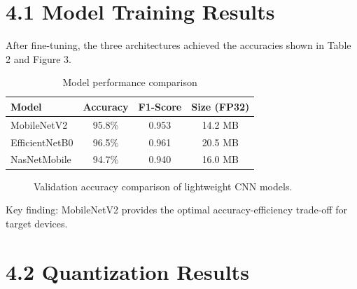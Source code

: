 \documentclass[12pt,letterpaper]{report}
\begin{document}
\section*{4.1 Model Training Results}

After fine-tuning, the three architectures achieved the accuracies shown in Table 2 and Figure 3.

\begin{table}[H]
\centering
\caption{Model performance comparison}
\label{tab:model_perf}
\begin{tabular}{@{}lccc@{}}
\toprule
\textbf{Model} & \textbf{Accuracy} & \textbf{F1-Score} & \textbf{Size (FP32)} \\
\midrule
MobileNetV2 & 95.8\% & 0.953 & 14.2 MB \\
EfficientNetB0 & 96.5\% & 0.961 & 20.5 MB \\
NasNetMobile & 94.7\% & 0.940 & 16.0 MB \\
\bottomrule
\end{tabular}
\end{table}

\begin{figure}[H]
\centering
{}
\caption{Validation accuracy comparison of lightweight CNN models.}
\label{fig:accuracy}
\end{figure}

Key finding: MobileNetV2 provides the optimal accuracy-efficiency trade-off for target devices.

\section*{4.2 Quantization Results}
\end{document}
